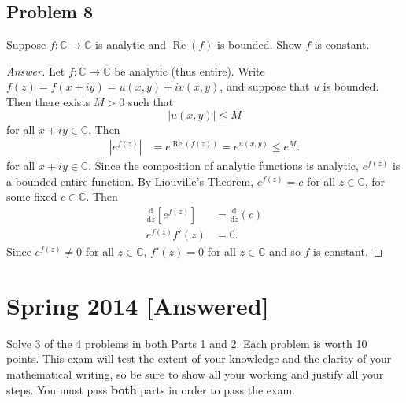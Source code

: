 \documentclass[12pt]{article}
\newcommand{\cx}{\mathbb{C}}
\newcommand\paren[1]{\left( #1 \right)}
\newcommand{\sqbrack}[1]{\left [ #1 \right ]}
\newcommand{\abs}[1]{\left| #1 \right|}
\theoremstyle{definition}
\DeclareMathOperator\re{Re}
\begin{document}
\subsection{Problem 8}
Suppose $f : \cx \to \cx$ is analytic and $\re(f)$ is bounded. Show $f$ is constant.
\begin{proof}[Answer]
    Let $f : \cx \to \cx$ be analytic (thus entire). Write $f(z) = f(x+iy) = u(x,y) + iv(x,y)$, and suppose that $u$ is bounded. Then there exists $M > 0$ such that 
    \[
        \abs{ u(x,y) } \leq M
    \]
    for all $x+iy \in \cx$. Then
    \begin{align*}
        \abs{ e^{f(z)} } & = e^{\re\paren{f(z)}} = e^{u(x,y)} \leq e^M.
    \end{align*}
    for all $x+iy \in \cx$. Since the composition of analytic functions is analytic, $e^{f(z)}$ is a bounded entire function. By Liouville's Theorem, $e^{f(z)} = c$ for all $z \in \cx$, for some fixed $c \in \cx$. Then 
    \begin{align*}
        \frac{\mathrm{d}}{\mathrm{d}z} \sqbrack{ e^{f(z)} } & = \frac{\mathrm{d}}{\mathrm{d}z} \paren{ c } \\
        e^{f(z)} f'(z) & = 0.
    \end{align*}
    Since $e^{f(z)} \neq 0$ for all $z \in \cx$, $f'(z) = 0$ for all $z \in \cx$ and so $f$ is constant.
\end{proof}
\newpage
\section{Spring 2014 [Answered]}
Solve 3 of the 4 problems in both Parts 1 and 2. Each problem is worth 10 points. This exam will test the extent of your knowledge and the clarity of your mathematical writing, so be sure to show all your working and justify all your steps. You must pass \textbf{both} parts in order to pass the exam. 
\end{document}
